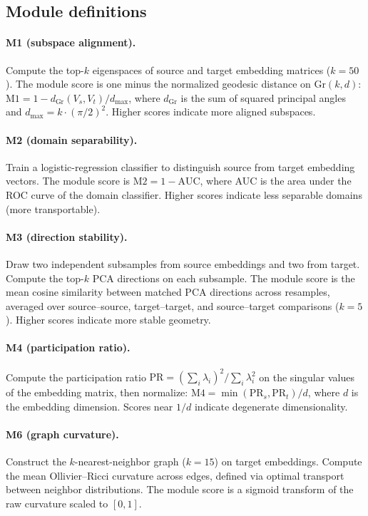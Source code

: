 \documentclass[9pt,lineno]{elife}
\newcommand{\Gr}{\mathrm{Gr}}
\begin{document}
\subsection{Module definitions}

\paragraph{M1 (subspace alignment).} Compute the top-$k$ eigenspaces of source and target embedding matrices ($k = 50$). The module score is one minus the normalized geodesic distance on $\Gr(k, d)$: $\text{M1} = 1 - d_{\Gr}(V_s, V_t) / d_{\max}$, where $d_{\Gr}$ is the sum of squared principal angles and $d_{\max} = k \cdot (\pi/2)^2$. Higher scores indicate more aligned subspaces.

\paragraph{M2 (domain separability).} Train a logistic-regression classifier to distinguish source from target embedding vectors. The module score is $\text{M2} = 1 - \text{AUC}$, where AUC is the area under the ROC curve of the domain classifier. Higher scores indicate less separable domains (more transportable).

\paragraph{M3 (direction stability).} Draw two independent subsamples from source embeddings and two from target. Compute the top-$k$ PCA directions on each subsample. The module score is the mean cosine similarity between matched PCA directions across resamples, averaged over source--source, target--target, and source--target comparisons ($k = 5$). Higher scores indicate more stable geometry.

\paragraph{M4 (participation ratio).} Compute the participation ratio $\text{PR} = (\sum_i \lambda_i)^2 / \sum_i \lambda_i^2$ on the singular values of the embedding matrix, then normalize: $\text{M4} = \min(\text{PR}_s, \text{PR}_t) / d$, where $d$ is the embedding dimension. Scores near $1/d$ indicate degenerate dimensionality.

\paragraph{M6 (graph curvature).} Construct the $k$-nearest-neighbor graph ($k = 15$) on target embeddings. Compute the mean Ollivier--Ricci curvature across edges, defined via optimal transport between neighbor distributions. The module score is a sigmoid transform of the raw curvature scaled to $[0, 1]$.
\end{document}
